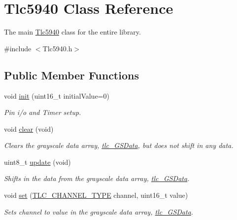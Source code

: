 \hypertarget{classTlc5940}{}\section{Tlc5940 Class Reference}
\label{classTlc5940}


The main \hyperlink{classTlc5940}{Tlc5940} class for the entire library.  




{\ttfamily \#include $<$Tlc5940.\+h$>$}

\subsection*{Public Member Functions}
\begin{DoxyCompactItemize}
\item 
void \hyperlink{group__CoreFunctions_gaa42fdda37a43a13f49b00924d93eedd4}{init} (uint16\+\_\+t initial\+Value=0)
\begin{DoxyCompactList}\small\item\em Pin i/o and Timer setup. \end{DoxyCompactList}\item 
void \hyperlink{group__CoreFunctions_ga5e5acd62f0c91579694ed4cffd88bd76}{clear} (void)
\begin{DoxyCompactList}\small\item\em Clears the grayscale data array, \hyperlink{Tlc5940_8h_a1560009c42233131f7abe72e8113f793}{tlc\+\_\+\+G\+S\+Data}, but does not shift in any data. \end{DoxyCompactList}\item 
uint8\+\_\+t \hyperlink{group__CoreFunctions_ga18ee51310250855d75cff715a5ff4d48}{update} (void)
\begin{DoxyCompactList}\small\item\em Shifts in the data from the grayscale data array, \hyperlink{Tlc5940_8h_a1560009c42233131f7abe72e8113f793}{tlc\+\_\+\+G\+S\+Data}. \end{DoxyCompactList}\item 
void \hyperlink{group__CoreFunctions_ga3d487c503365fa5b948b6711b9dac73e}{set} (\hyperlink{tlc__config_8h_ab23dc44a3be02131509f5ab61f68530e}{T\+L\+C\+\_\+\+C\+H\+A\+N\+N\+E\+L\+\_\+\+T\+Y\+PE} channel, uint16\+\_\+t value)
\begin{DoxyCompactList}\small\item\em Sets channel to value in the grayscale data array, \hyperlink{Tlc5940_8h_a1560009c42233131f7abe72e8113f793}{tlc\+\_\+\+G\+S\+Data}. \end{DoxyCompactList}\item 

\end{DoxyCompactItemize}
